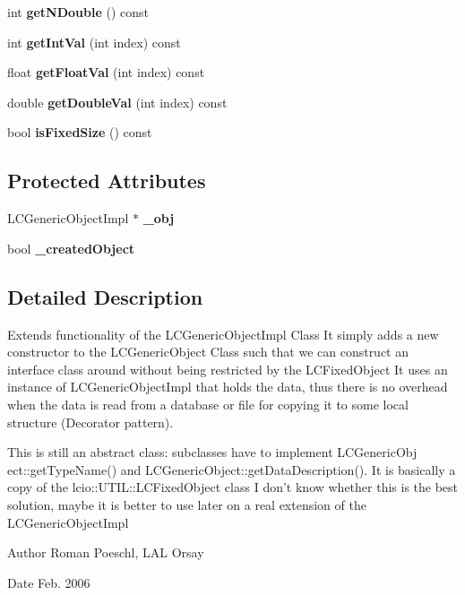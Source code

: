 \begin{DoxyCompactItemize}
\item 
int {\bfseries getNDouble} () const \label{classCALICE_1_1LCGenericObjectImplExt_aa8503a0fc8e66c4e0e374e32bb594231}

\item 
int {\bfseries getIntVal} (int index) const \label{classCALICE_1_1LCGenericObjectImplExt_a57a61745bb48cd3917ddf1ba37f8a3e0}

\item 
float {\bfseries getFloatVal} (int index) const \label{classCALICE_1_1LCGenericObjectImplExt_adda599738de7681f6c0d1b2aa3b09f79}

\item 
double {\bfseries getDoubleVal} (int index) const \label{classCALICE_1_1LCGenericObjectImplExt_ae10468f12c1a49ce00fceeb3f6664cbe}

\item 
bool {\bfseries isFixedSize} () const \label{classCALICE_1_1LCGenericObjectImplExt_ae546a36a343a9376e818e0b2d9a96e4d}

\end{DoxyCompactItemize}
\subsection*{Protected Attributes}
\begin{DoxyCompactItemize}
\item 
LCGenericObjectImpl $\ast$ {\bfseries \_\-obj}\label{classCALICE_1_1LCGenericObjectImplExt_a29179cf5508768d2cdbc9e2e6997bfdf}

\item 
bool {\bfseries \_\-createdObject}\label{classCALICE_1_1LCGenericObjectImplExt_a65c76ade794ece6642ce4a6fc0ed1a8f}

\end{DoxyCompactItemize}


\subsection{Detailed Description}
Extends functionality of the LCGenericObjectImpl Class It simply adds a new constructor to the LCGenericObject Class such that we can construct an interface class around without being restricted by the LCFixedObject It uses an instance of LCGenericObjectImpl that holds the data, thus there is no overhead when the data is read from a database or file for copying it to some local structure (Decorator pattern). \par
 This is still an abstract class: subclasses have to implement LCGenericObj ect::getTypeName() and LCGenericObject::getDataDescription(). It is basically a copy of the lcio::UTIL::LCFixedObject class I don't know whether this is the best solution, maybe it is better to use later on a real extension of the LCGenericObjectImpl \begin{DoxyAuthor}{Author}
Roman Poeschl, LAL Orsay 
\end{DoxyAuthor}
\begin{DoxyDate}{Date}
Feb. 2006 
\end{DoxyDate}


